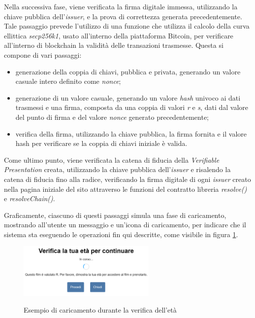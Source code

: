 Nella successiva fase, viene verificata la firma digitale immessa, utilizzando la chiave pubblica dell'\textit{issuer}, e la prova di correttezza generata precedentemente.
Tale passaggio prevede l'utilizzo di una funzione che utilizza il calcolo della curva ellittica \textit{secp256k1}, usato all'interno della piattaforma Bitcoin, per verificare all'interno di blockchain
la validità delle transazioni trasmesse. Questa si compone di vari passaggi:
\begin{itemize}
    \item generazione della coppia di chiavi, pubblica e privata, generando un valore casuale intero definito come \textit{nonce};
    \item generazione di un valore casuale, generando un valore \textit{hash} univoco ai dati trasmessi e una firma, composta da una coppia di valori \textit{r} e \textit{s}, 
    dati dal valore del punto di firma e del valore \textit{nonce} generato precedentemente;
    \item verifica della firma, utilizzando la chiave pubblica, la firma fornita e il valore hash per verificare se la coppia di chiavi iniziale è valida.
\end{itemize}

Come ultimo punto, viene verificata la catena di fiducia della \textit{Verifiable Presentation} creata, utilizzando la chiave pubblica dell'\textit{issuer} e risalendo
la catena di fiducia fino alla radice, verificando la firma digitale di ogni \textit{issuer} creato nella pagina iniziale del sito attraverso le funzioni del contratto libreria
\textit{resolve()} e \textit{resolveChain()}.

Graficamente, ciascuno di questi passaggi simula una fase di caricamento, mostrando all'utente un messaggio e un'icona di caricamento, per indicare che il sistema sta eseguendo
le operazioni fin qui descritte, come visibile in figura \ref{fig:verifica-eta-corso}.

\begin{figure}[h]
    \centering
    \includegraphics[width=0.6\textwidth, alt={Finestra visualizzata di caricamento durante la verifica dell'età}]{immagini/frontend/verification-doing.png}
    \caption{Esempio di caricamento durante la verifica dell'età}\label{fig:verifica-eta-corso}
\end{figure}

